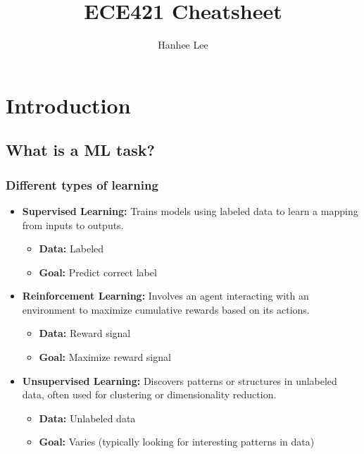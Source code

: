 \documentclass{article}
\title{ECE421 Cheatsheet}
\author{Hanhee Lee}
\begin{document}
\maketitle

\tableofcontents

\listoffigures

\listoftables

\section{Introduction}
    \subsection{What is a ML task?}
        \subsubsection{Different types of learning}
            \begin{definition}
                \begin{itemize}
                    \item \textbf{Supervised Learning:} Trains models using labeled data to learn a mapping from inputs to outputs.
                    \begin{itemize}
                        \item \textbf{Data:} Labeled
                        \item \textbf{Goal:} Predict correct label
                    \end{itemize}
                    \item \textbf{Reinforcement Learning:} Involves an agent interacting with an environment to maximize cumulative rewards based on its actions.
                    \begin{itemize}
                        \item \textbf{Data:} Reward signal
                        \item \textbf{Goal:} Maximize reward signal
                    \end{itemize}
                    \item \textbf{Unsupervised Learning:} Discovers patterns or structures in unlabeled data, often used for clustering or dimensionality reduction.
                    \begin{itemize}
                        \item \textbf{Data:} Unlabeled data
                        \item \textbf{Goal:} Varies (typically looking for interesting patterns in data)
                    \end{itemize}
                \end{itemize}            
            \end{definition}
\end{document}
